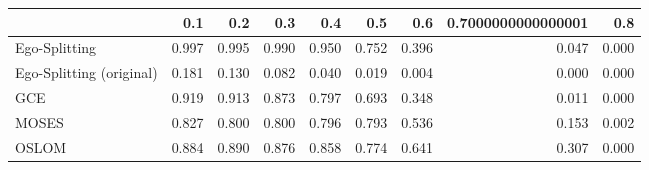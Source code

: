 \begin{tabular}{lrrrrrrrr}
\toprule
{} &   0.1 &   0.2 &   0.3 &   0.4 &   0.5 &   0.6 & 0.7000000000000001 &   0.8 \\
\midrule
Ego-Splitting            & 0.997 & 0.995 & 0.990 & 0.950 & 0.752 & 0.396 &              0.047 & 0.000 \\
Ego-Splitting (original) & 0.181 & 0.130 & 0.082 & 0.040 & 0.019 & 0.004 &              0.000 & 0.000 \\
GCE                      & 0.919 & 0.913 & 0.873 & 0.797 & 0.693 & 0.348 &              0.011 & 0.000 \\
MOSES                    & 0.827 & 0.800 & 0.800 & 0.796 & 0.793 & 0.536 &              0.153 & 0.002 \\
OSLOM                    & 0.884 & 0.890 & 0.876 & 0.858 & 0.774 & 0.641 &              0.307 & 0.000 \\
\bottomrule
\end{tabular}
